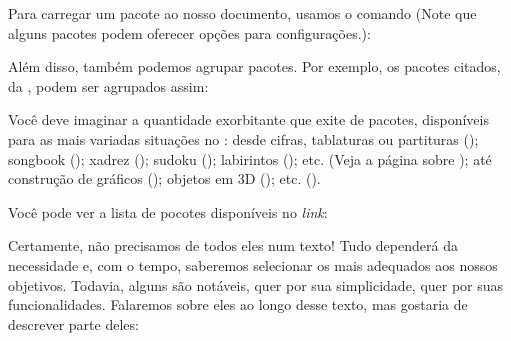 Para carregar um pacote ao nosso documento, usamos o comando (Note que alguns 
pacotes podem oferecer opções para configurações.): 


Além disso, também podemos agrupar pacotes. 
Por exemplo, os pacotes citados, da , podem ser agrupados assim:


Você deve imaginar a quantidade exorbitante que exite de pacotes, 
disponíveis para as mais variadas situações no : 
desde cifras, tablaturas ou partituras ();
songbook (); 
xadrez (); 
sudoku ();
labirintos (); 
etc. (Veja a página sobre  ); até 
construção de gráficos (); 
objetos em 3D ();
etc. ().

Você pode ver a lista de pocotes disponíveis no \textit{link}:


Certamente, não precisamos de todos eles num texto!
Tudo dependerá da necessidade e, com o tempo, saberemos selecionar os mais 
adequados aos nossos objetivos.
Todavia, alguns são notáveis, quer por sua simplicidade, quer por suas funcionalidades.
Falaremos sobre eles ao longo desse texto, mas gostaria de descrever parte deles:

